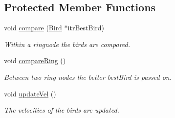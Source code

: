 \subsection*{Protected Member Functions}
\begin{CompactItemize}
\item 
void \hyperlink{classRingSwarm_0c1b5e24190746a5880d95cf6dd16a15}{compare} (\hyperlink{classBird}{Bird} $\ast$itrBestBird)
\begin{CompactList}\small\item\em Within a ringnode the birds are compared. \item\end{CompactList}\item 
void \hyperlink{classRingSwarm_37763e20c628ea4d47c2ddc5d0a2d985}{compareRing} ()
\begin{CompactList}\small\item\em Between two ring nodes the better bestBird is passed on. \item\end{CompactList}\item 
void \hyperlink{classRingSwarm_6af7a38a18e36ee6dfb3b6e4524f9da9}{updateVel} ()
\begin{CompactList}\small\item\em The velocities of the birds are updated. \item\end{CompactList}\end{CompactItemize}
